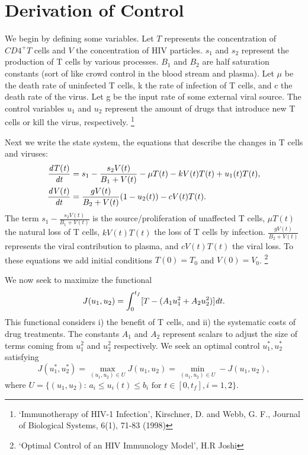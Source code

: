 %

\section*{Derivation of Control}
We begin by defining some variables.
Let $T$ represents the concentration of $CD4^+T$ cells and $V$ the concentration of HIV particles.
$s_1$ and $s_2$ represent the production of T cells by various processes.
$B_1$ and $B_2$ are half saturation constants (sort of like crowd control in the blood stream and plasma).
Let $\mu$ be the death rate of uninfected T cells, k the rate of infection of T cells, and c the death rate of the virus.
Let g be the input rate of some external viral source.
The control variables $u_1$ and $u_2$ represent the amount of drugs that introduce new T cells or kill the virus, respectively.
\footnote{`Immunotherapy of HIV-1 Infection', Kirschner, D. and Webb, G. F., Journal of Biological Systems, 6(1), 71-83 (1998)}

Next we write the state system, the equations that describe the changes in T cells and viruses:
\begin{align}
	\begin{split}
		\frac{\it{d}T(t)}{\it{dt}} &= s_1 - \frac{s_2V(t)}{B_1+V(t)} - \mu T(t)-kV(t)T(t)+u_1(t)T(t), \\
		\frac{\it{d}V(t)}{\it{dt}} &= \frac{gV(t)}{B_2+V(t)}(1-u_2(t)) - cV(t)T(t).
	\end{split} \label{original_state:HIV}
\end{align}
The term $s_1-\frac{s_2V(t)}{B_1+V(t)}$ is the source/proliferation of unaffected T cells,
$\mu T(t)$ the natural loss of T cells, $kV(t)T(t)$ the loss of T cells by infection. 
$\frac{gV(t)}{B_2+V(t)}$ represents the viral contribution to plasma, and $cV(t)T(t)$ the viral loss.
To these equations we add initial conditions $T(0)=T_0$ and $V(0)=V_0$.
\footnote{`Optimal Control of an HIV Immunology Model', H.R Joshi}

We now seek to maximize the functional 
\[
J(u_1,u_2) = \int_0^{t_f}[T-(A_1u_1^2+A_2u_2^2)]\it{dt}.
\]
This functional considers i) the benefit of T cells, and ii) the systematic costs of drug treatments.
The constants $A_1$ and $A_2$ represent scalars to adjust the size of terms coming from $u_1^2$ and $u_2^2$ respectively. 
We seek an optimal control $u_1^*,u_2^*$ satisfying
\[
J(u_1^*,u_2^*)=\max_{(u_1,u_2)\in U}J(u_1,u_2) =\min_{(u_1,u_2)\in U}-J(u_1,u_2),
\]
where $U=\{(u_1,u_2):\,a_i\le u_i(t) \le b_i\text{ for }t\in[0,t_f], i=1,2\}$.
 
